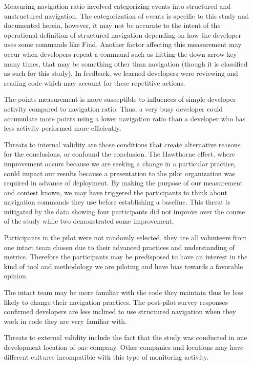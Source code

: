 \documentclass{sig-alternate}
\begin{document}
Measuring navigation ratio involved categorizing events into structured and unstructured navigation.  The categorization of events is specific to this study and documented herein, however, it may not be accurate to the intent of the operational definition of structured navigation depending on how the developer uses some commands like Find.  Another factor affecting this measurement may occur when developers repeat a command such as hitting the down arrow key many times, that may be something other than navigation (though it is classified as such for this study).  In feedback, we learned developers were reviewing and reading code which may account for these repetitive actions.

The points measurement is more susceptible to influences of simple developer activity compared to navigation ratio.  Thus, a very busy developer could accumulate more points using a lower navigation ratio than a developer who has less activity performed more efficiently.  

Threats to internal validity are those conditions that create alternative reasons for the conclusions, or confound the conclusion.  
The Hawthorne effect, where improvement occurs because we are seeking a change in a particular practice, could impact our results because a presentation  to the pilot organization was required in advance of deployment.  By making the purpose of our measurement and contest known,  we may have triggered the participants to think about navigation commands they use before establishing a baseline.   This threat is mitigated by the data showing four participants did not improve over the course of the study while two demonstrated some improvement.

Participants in the pilot were not randomly selected, they are all volunteers from one intact team chosen due to their advanced practices and understanding of metrics.  Therefore the participants may be predisposed to have an interest in the kind of tool and methodology we are piloting and have bias towards a favorable opinion.  

The intact team may be more familiar with the code they maintain thus be less likely to change their navigation practices.  The post-pilot survey responses confirmed developers are less inclined to use structured navigation when they work in code they are very familiar with.  

Threats to external validity include the fact that the study was conducted in one development location of one company.  Other companies and locations may have different cultures incompatible with this type of monitoring activity.
\end{document}
